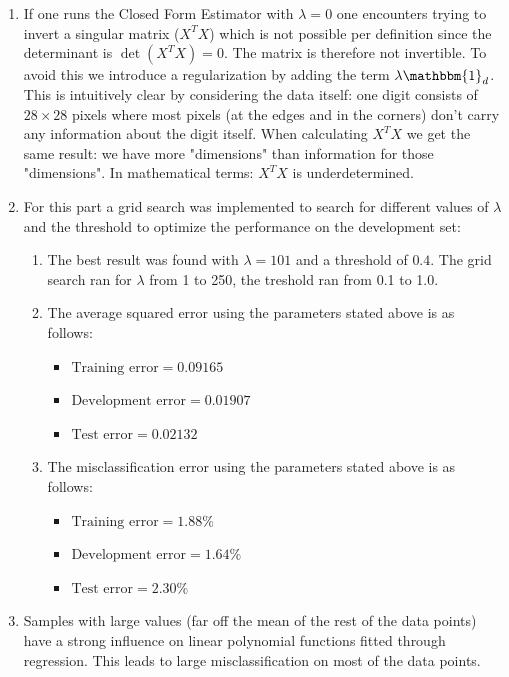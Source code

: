 \documentclass[12pt]{article}
\begin{document}
\begin{enumerate}
	\item If one runs the Closed Form Estimator with $\lambda = 0$ one encounters trying to invert a singular matrix ($X^TX$) which is not possible per definition since the determinant is $\det(X^TX)=0$. The matrix is therefore not invertible. To avoid this we introduce a regularization by adding the term $\lambda\mathbbm{1}_d$. This is intuitively clear by considering the data itself: one digit consists of $28\times 28$ pixels where most pixels (at the edges and in the corners) don't carry any information about the digit itself. When calculating $X^TX$ we get the same result: we have more "dimensions" than information for those "dimensions". In mathematical terms: $X^TX$ is underdetermined.
	\item For this part a grid search was implemented to search for different values of $\lambda$ and the threshold to optimize the performance on the development set:
		\begin{enumerate}[label=(\alph*)]
			\item The best result was found with $\lambda=101$ and a threshold of $0.4$. The grid search ran for $\lambda$ from 1 to 250, the treshold ran from 0.1 to 1.0.
			\item The average squared error using the parameters stated above is as follows:
				\begin{itemize}
					\item $\text{Training error}=0.09165$
					\item $\text{Development error}=0.01907$
					\item $\text{Test error}=0.02132$
				\end{itemize}
			\item The misclassification error using the parameters stated above is as follows:
			\begin{itemize}
				\item $\text{Training error}=1.88\%$
				\item $\text{Development error}=1.64\%$
				\item $\text{Test error}=2.30\%$
			\end{itemize}
		\end{enumerate}
	\item Samples with large values (far off the mean of the rest of the data points) have a strong influence on linear polynomial functions fitted through regression. This leads to large misclassification on most of the data points. 
\end{enumerate}
\end{document}
